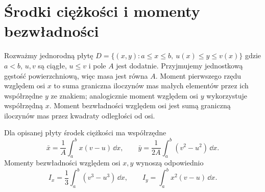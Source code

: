 \section{Środki ciężkości i momenty bezwładności}
Rozważmy jednorodną płytę $D=\{(x,y):a\le x\le b,\ u(x)\le y\le v(x)\}$ gdzie $a<b$, $u,v$ są ciągłe, $u\le v$ i pole $A$ jest dodatnie. Przyjmujemy jednostkową gęstość powierzchniową, więc masa jest równa $A$. Moment pierwszego rzędu względem osi $x$ to suma graniczna iloczynów mas małych elementów przez ich współrzędne $y$ ze znakiem; analogicznie moment względem osi $y$ wykorzystuje współrzędną $x$. Moment bezwładności względem osi jest sumą graniczną iloczynów mas przez kwadraty odległości od osi.

\begin{twierdzenie}
\label{ma1:thm:lamina-moments}
Dla opisanej płyty środek ciężkości ma współrzędne
\[
 \bar x=\frac1A\int_a^b x(v-u)\,\dd x,\qquad
 \bar y=\frac1{2A}\int_a^b(v^2-u^2)\,\dd x.
\]
Momenty bezwładności względem osi $x,y$ wynoszą odpowiednio
\[
 I_x=\frac13\int_a^b(v^3-u^3)\,\dd x,\qquad
 I_y=\int_a^b x^2(v-u)\,\dd x.
\]
\end{twierdzenie}
